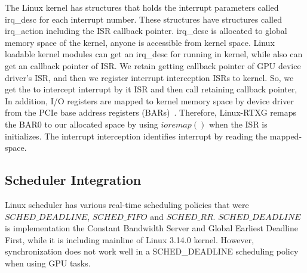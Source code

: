 The Linux kernel has structures that holds the interrupt parameters called irq\_desc for each interrupt number.
These structures have structures called irq\_action including the ISR callback pointer.
irq\_desc is allocated to global memory space of the kernel, anyone is accessible from kernel space.
Linux loadable kernel modules can get an irq\_desc for running in kernel, while also can get an callback pointer of ISR.
We retain getting callback pointer of GPU device driver's ISR, and then we register interrupt interception ISRs to kernel.
So, we get the to intercept interrupt by it ISR and then call retaining callback pointer, 
In addition, I/O registers are mapped to kernel memory space by device driver from the PCIe base address registers (BARs)~\cite{fujii:icpads2013,kato2013zero}.
Therefore, Linux-RTXG remaps the BAR0 to our allocated space by using $ioremap()$ when the ISR is initializes.
The interrupt interception identifies interrupt by reading the mapped-space.

\subsection{Scheduler Integration}
Linux scheduler has various real-time scheduling policies that were $SCHED\_DEADLINE$, $SCHED\_FIFO$ and $SCHED\_RR$.
$SCHED\_DEADLINE$ is implementation the Constant Bandwidth Server and Global Earliest Deadline First,
while it is including mainline of Linux 3.14.0 kernel.
However, synchronization does not work well in a SCHED\_DEADLINE scheduling policy when using GPU tasks.

